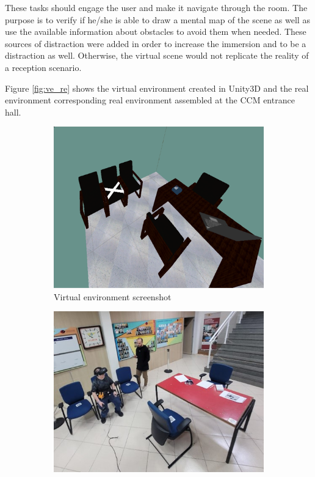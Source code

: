         
        
        These tasks should engage the user and make it navigate through the room. The purpose is to verify if he/she is able to draw a mental map of the scene as well as use the available information about obstacles to avoid them when needed. These sources of distraction were added in order to increase the immersion and to be a distraction as well. Otherwise, the virtual scene would not replicate the reality of a reception scenario.

        Figure \ref{fig:ve_re} shows the virtual environment created in Unity3D and the real environment corresponding real environment assembled at the CCM entrance hall. 
    
        \begin{figure}[!htb]
            \centering
            \begin{subfigure}[b]{0.49\textwidth}
                \centering
                \includegraphics[width=\textwidth]{Metodologia/VE.png}
                \caption{Virtual environment screenshot}
                \label{fig:ve_photo}
            \end{subfigure}
            \hfill
            \begin{subfigure}[b]{0.49\textwidth}
                \centering
                \includegraphics[width=\textwidth]{Metodologia/RE.jpg}

\end{subfigure}
\end{figure}

